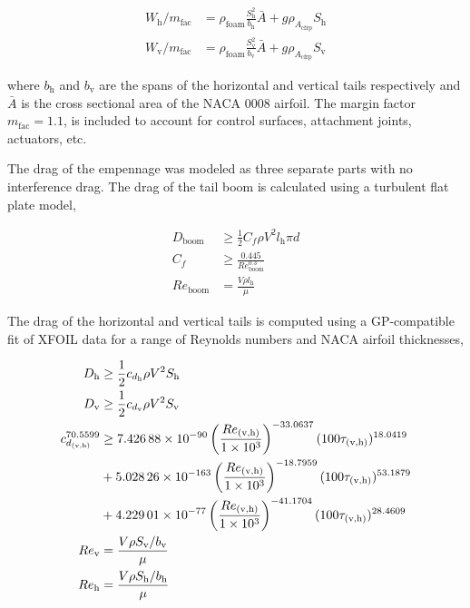 \documentclass[]{aiaa-tc}%
\begin{document}
\begin{align}
    \label{e:htweight}
    W_{\text{h}}/m_{\text{fac}} &= \rho_{\text{foam}} \frac{S_{\text{h}}^2}{b_{\text{h}}} \bar{A} + g\rho_{A_{\text{cfrp}}} S_{\text{h}} \\
    \label{e:vtweight}
    W_{\text{v}}/m_{\text{fac}} &= \rho_{\text{foam}} \frac{S_{\text{v}}^2}{b_{\text{v}}} \bar{A} + g\rho_{A_{\text{cfrp}}} S_{\text{v}}
\end{align}

where $b_{\text{h}}$ and $b_{\text{v}}$ are the spans of the horizontal and vertical tails respectively and $\bar{A}$ is the cross sectional area of the NACA 0008 airfoil. The margin factor $m_{\text{fac}}=1.1$, is included to account for control surfaces, attachment joints, actuators, etc. 

The drag of the empennage was modeled as three separate parts with no interference drag.  The drag of the tail boom is calculated using a turbulent flat plate model,

\begin{align}
    \label{e:boomdrag}
    D_{\text{boom}} &\geq \frac{1}{2} C_f \rho V^2 l_{\text{h}}\pi d \\
    C_f &\geq \frac{0.445}{Re_{\text{boom}}^{0.3}} \\
    Re_{\text{boom}} &= \frac{V\rho l_{\text{h}}}{\mu}
\end{align}

The drag of the horizontal and vertical tails is computed using a GP-compatible fit of XFOIL data for a range of Reynolds numbers and NACA airfoil thicknesses,

\begin{align}
    D_{\text{h}} &\geq \frac{1}{2} c_{d_{\text{h}}} \rho V^2 S_{\text{h}} \\
    D_{\text{v}} &\geq \frac{1}{2} c_{d_{\text{v}}} \rho V^2 S_{\text{v}} \\
    \label{e:taildrag}
    c_{d_{\text{(v,h)}}}^{70.5599} &\geq \num{7.42688d-90} \left( \frac{Re_{\text{(v,h)}}}{\num{1d3}} \right)^{-33.0637}(100 \tau_{\text{(v,h)}})^{18.0419}  \nonumber \\
                 & + \num{5.02826d-163}\left(\frac{Re_{\text{(v,h)}}}{\num{1d3}}\right)^{-18.7959} (100\tau_{\text{(v,h)}})^{53.1879} \\
                 &+ \num{4.22901d-77}\left(\frac{Re_{\text{(v,h)}}}{\num{1d3}}\right)^{-41.1704} (100\tau_{\text{(v,h)}})^{28.4609} \nonumber \\
    Re_{\text{v}} &= \frac{V\rho S_{\text{v}}/b_{\text{v}}}{\mu} \\
    Re_{\text{h}} &= \frac{V\rho S_{\text{h}}/b_{\text{h}}}{\mu} 
\end{align}
\end{document}
